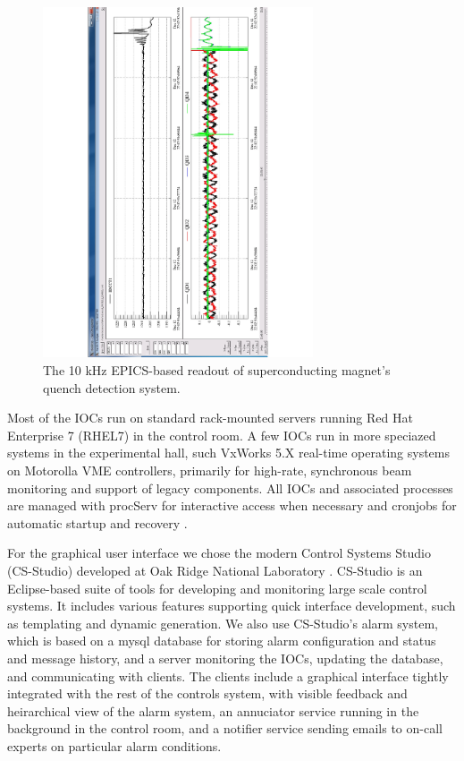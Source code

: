 \begin{figure}[htbp]\centering
\includegraphics[angle=270,width=8cm]{img/tordaq}
\caption{The 10 kHz EPICS-based readout of superconducting magnet's quench detection system.\label{fig:tordaq}}
\end{figure}

Most of the IOCs run on standard rack-mounted servers running Red Hat Enterprise 7 (RHEL7) in the control room.  A few IOCs run in more speciazed systems in the experimental hall, such VxWorks 5.X real-time operating systems on Motorolla VME controllers, primarily for high-rate, synchronous beam monitoring and support of legacy components.  All IOCs and associated processes are managed with procServ for interactive access when necessary and cronjobs for automatic startup and recovery \cite{procserv-website}.

For the graphical user interface we chose the modern Control Systems Studio (CS-Studio) developed at Oak Ridge National Laboratory \cite{css-website}.   CS-Studio is an Eclipse-based suite of tools for developing and monitoring large scale control systems.  It includes various features supporting quick interface development, such as templating and dynamic generation.  We also use CS-Studio's alarm system, which is based on a mysql database for storing alarm configuration and status and message history, and a server monitoring the IOCs, updating the database, and communicating with clients.  The clients include a graphical interface tightly integrated with the rest of the controls system, with visible feedback and heirarchical view of the alarm system, an annuciator service running in the background in the control room, and a notifier service sending emails to on-call experts on particular alarm conditions.

